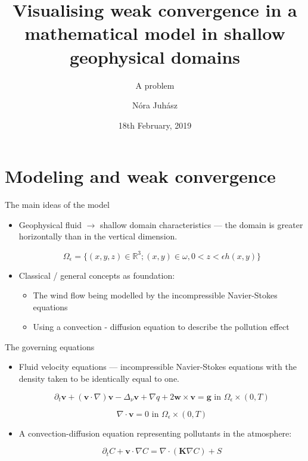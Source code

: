 \documentclass{beamer}
\title{Visualising weak convergence in a mathematical model in shallow geophysical domains}
\subtitle{A problem}
\author{N\'ora Juh\'asz}
\date{18th February, 2019}
\begin{document}
\begin{frame}
\titlepage
\end{frame}

\section{Modeling and weak convergence}

\begin{frame}{The main ideas of the model}
  \begin{itemize}
    \item Geophysical fluid $\to$ shallow domain characteristics --- the domain is greater horizontally than in the vertical dimension.
    
    $$ \Omega_{\epsilon} = \{(x,y,z) \in \mathbb{R}^3 ; (x,y) \in \omega, 0 < z < \epsilon h(x,y) \} $$
    
    \item Classical / general concepts as foundation:
    \begin{itemize}
      \item The wind flow being modelled by the incompressible Navier-Stokes equations
      \item Using a convection - diffusion equation to describe the pollution effect
    \end{itemize}
  \end{itemize}
\end{frame}

\begin{frame}{The governing equations}
  \begin{itemize}
    \item Fluid velocity equations --- incompressible Navier-Stokes equations with the density taken to be identically equal to one.
      
      $$\partial_t \mathbf{v} + (\mathbf{v} \cdot \nabla)\mathbf{v} -\Delta_{\nu} \mathbf{v} + \nabla q + 2 \mathbf{w} \times \mathbf{v}= \mathbf{g} \text{ in } \Omega_{\epsilon} \times (0,T)$$
    
      $$\nabla \cdot \mathbf{v} = 0 \text{ in } \Omega_{\epsilon} \times (0,T)$$

    \item A convection-diffusion equation representing pollutants in the atmosphere:
    
      $$ \partial_t C + \mathbf{v} \cdot \nabla C = \nabla \cdot (\mathbf{K} \nabla C) + S $$

  \end{itemize}
\end{frame}
\end{document}
